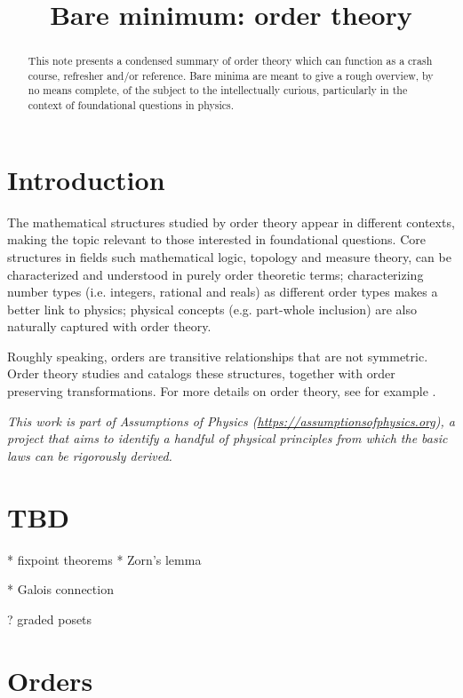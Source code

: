 \documentclass{article}
\title{Bare minimum: order theory}
\date{\vspace{-5ex}}
\begin{document}
\maketitle


\begin{abstract}
This note presents a condensed summary of order theory which can function as a crash course, refresher and/or reference. Bare minima are meant to give a rough overview, by no means complete, of the subject to the intellectually curious, particularly in the context of foundational questions in physics.
\end{abstract}

\section{Introduction}

The mathematical structures studied by order theory appear in different contexts, making the topic relevant to those interested in foundational questions. Core structures in fields such mathematical logic, topology and measure theory, can be characterized and understood in purely order theoretic terms; characterizing number types (i.e. integers, rational and reals) as different order types makes a better link to physics; physical concepts (e.g. part-whole inclusion) are also naturally captured with order theory.

Roughly speaking, orders are transitive relationships that are not symmetric. Order theory studies and catalogs these structures, together with order preserving transformations. For more details on order theory, see for example \cite{davey2002introduction, pinter2014book}.

\emph{This work is part of Assumptions of Physics (\url{https://assumptionsofphysics.org}), a project that aims to identify a handful of physical principles from which the basic laws can be rigorously derived.}

\section{TBD}

* fixpoint theorems
* Zorn's lemma

* Galois connection

? graded posets

\section{Orders}
\end{document}
